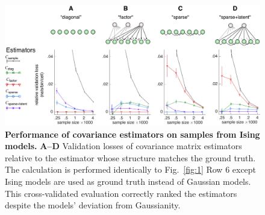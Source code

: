 \begin{figure}
\begin{fullpage}
	\begin{center}
    \includegraphics[width=\textwidth]{./figures/Figure2.png}
    \end{center}
\caption[Performance of covariance estimators on samples from Ising models]
{{\bf Performance of covariance estimators on samples from Ising models.}
{\bf A--D} Validation losses of covariance matrix estimators relative to the estimator whose structure matches the ground truth. 
The calculation is performed identically to Fig.~\ref{fig:1} Row 6 except Ising models are used as ground truth instead of Gaussian models.
This cross-validated evaluation correctly ranked the estimators despite the models' deviation from Gaussianity.
}\label{fig:2}
\end{fullpage}
\end{figure}